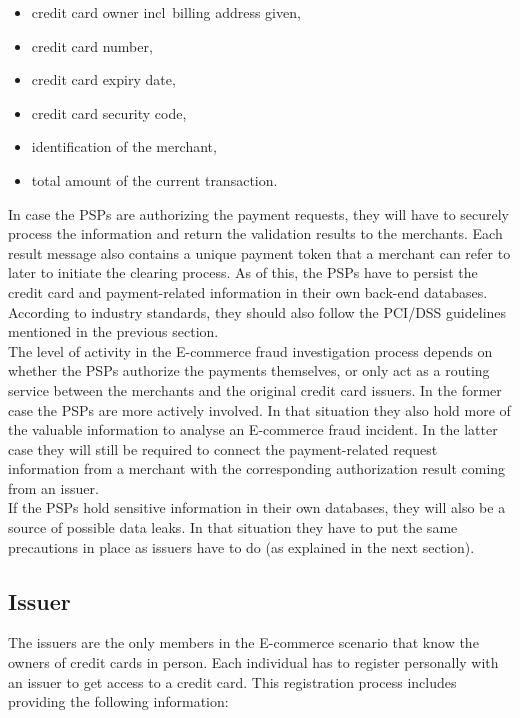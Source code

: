 \begin{itemize}
		\item credit card owner \gls{incl}\ billing address given,
		\item credit card number,
		\item credit card expiry date,
		\item credit card security code,
		\item identification of the merchant,
		\item total amount of the current transaction.
\end{itemize}

In case the \gls{PSP}s are authorizing the payment requests, they will have to securely process the information and return the validation results to the merchants. Each result message also contains a unique payment token that a merchant can refer to later to initiate the clearing process. As of this, the \gls{PSP}s have to persist the credit card and payment-related information in their own back-end databases. According to industry standards, they should also follow the \gls{PCI/DSS} guidelines mentioned in the previous section. \\

The level of activity in the \gls{E-commerce} fraud investigation process depends on whether the \gls{PSP}s authorize the payments themselves, or only act as a routing service between the merchants and the original credit card issuers. In the former case the \gls{PSP}s are more actively involved. In that situation they also hold more of the valuable information to analyse an \gls{E-commerce} fraud incident. In the latter case they will still be required to connect the payment-related request information from a merchant with the corresponding authorization result coming from an issuer. \\

If the \gls{PSP}s hold sensitive information in their own databases, they will also be a source of possible data leaks. In that situation they have to put the same precautions in place as issuers have to do (as explained in the next section).


\subsection{Issuer}
\label{subsec:stakeholder_issuer}

The issuers are the only members in the \gls{E-commerce} scenario that know the owners of credit cards in person. Each individual has to register personally with an issuer to get access to a credit card. This registration process includes providing the following information: \@

